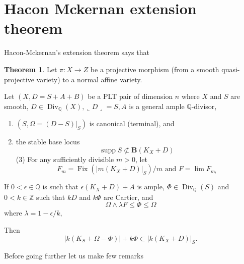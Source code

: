 \documentclass[11pt]{article}
\theoremstyle{definition}
\newtheorem{theorem}{Theorem}[section]
\begin{document}
	\section{Hacon Mckernan extension theorem}
	Hacon-Mckernan's extension theorem says that 
	\begin{theorem}
		
		Let $\pi: X \rightarrow Z$ be a projective morphism (from a smooth quasi-projective variety) to a normal affine variety. 
		
		Let $(X, D=S+A+B)$ be a PLT pair of dimension $n$ where $X$ and $S$ are smooth, $D \in \operatorname{Div}_{\mathbb{Q}}(X),\llcorner D\lrcorner=S, A$ is a general ample $\mathbb{Q}$-divisor,
		
		\begin{enumerate}
			\item $\left(S, \Omega=\left.(D-S)\right|_S\right)$ is canonical (terminal), and
			\item the stable base locus $$\operatorname{supp}S \not \subset \mathbf{B}(K_X+D)$$(3) For any sufficiently divisible $m>0$, let
			$$
			F_m=\operatorname{Fix}\left(\left|m\left(K_X+D\right)\right|_S\right) / m
			\text{ and } F=\lim F_{m_!}$$
		\end{enumerate}
		
		If $0<\epsilon \in \mathbb{Q}$ is such that $\epsilon\left(K_X+D\right)+A$ is ample, $\Phi \in \operatorname{Div}_{\mathbb{Q}}(S)$ and $0<k \in \mathbb{Z}$ such that $k D$ and $k \Phi$ are Cartier, and $$\Omega \wedge \lambda F \leq \Phi \leq \Omega$$where $\lambda=1-\epsilon / k$,
		
		Then
		$$
		\left|k\left(K_S+\Omega-\Phi\right)\right|+k \Phi \subset\left|k\left(K_X+D\right)\right|_S .
		$$
		
	\end{theorem}
	Before going further let us make few remarks
\end{document}
